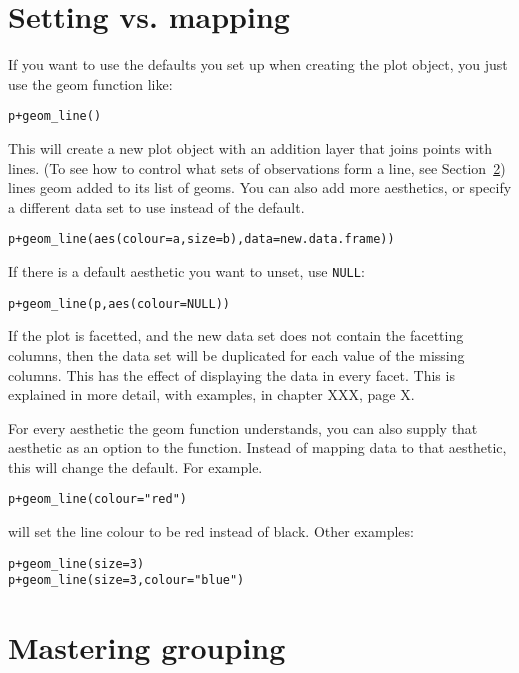 \section{Setting vs. mapping}
\label{ref:setting-mapping}

If you want to use the defaults you set up when creating the plot object, you just use the geom function like:

\begin{alltt}
p + geom_line()
\end{alltt}

This will create a new plot object with an addition layer that joins points with lines.  (To see how to control what sets of observations form a line, see Section~\ref{sec:grouping}) lines geom added to its list of geoms.   You can also add more aesthetics, or specify a different data set to use instead of the default.  

\begin{alltt}
p + geom_line(aes(colour=a, size=b), data=new.data.frame))
\end{alltt}

If there is a default aesthetic you want to unset, use {\tt NULL}:

\begin{alltt}
p + geom_line(p, aes(colour=NULL))
\end{alltt}

If the plot is facetted, and the new data set does not contain the facetting columns, then the data set will be duplicated for each value of the missing columns.  This has the effect of displaying the data in every facet.  This is explained in more detail, with examples, in chapter XXX, page X.

For every aesthetic the geom function understands, you can also supply that aesthetic as an option to the function.  Instead of mapping data to that aesthetic, this will change the default.  For example.

\begin{alltt}
p + geom_line(colour="red")  
\end{alltt}

\noindent will set the line colour to be red instead of black.  Other examples:

\begin{alltt}
p + geom_line(size=3)  
p + geom_line(size=3, colour="blue")  
\end{alltt}

\section{Mastering grouping}
\label{sec:grouping}

